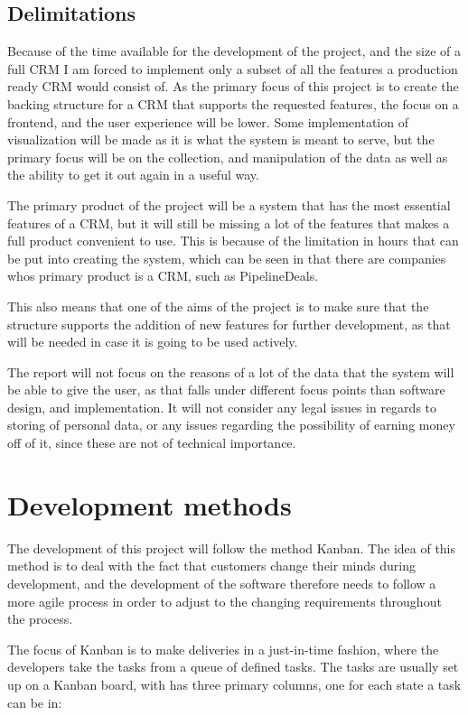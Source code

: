 \subsection{Delimitations}
\label{sub:Delimitations}
Because of the time available for the development of the project, and the size of a full CRM I am forced to implement only a subset of all the features a production ready CRM would consist of. As the primary focus of this project is to create the backing structure for a CRM that supports the requested features, the focus on a frontend, and the user experience will be lower. Some implementation of visualization will be made as it is what the system is meant to serve, but the primary focus will be on the collection, and manipulation of the data as well as the ability to get it out again in a useful way.

The primary product of the project will be a system that has the most essential features of a CRM, but it will still be missing a lot of the features that makes a full product convenient to use. This is because of the limitation in hours that can be put into creating the system, which can be seen in that there are companies whos primary product is a CRM, such as PipelineDeals.

This also means that one of the aims of the project is to make sure that the structure supports the addition of new features for further development, as that will be needed in case it is going to be used actively.

The report will not focus on the reasons of a lot of the data that the system will be able to give the user, as that falls under different focus points than software design, and implementation. It will not consider any legal issues in regards to storing of personal data, or any issues regarding the possibility of earning money off of it, since these are not of technical importance.

\section{Development methods}
\label{sec:Development methods}
The development of this project will follow the method Kanban. The idea of this method is to deal with the fact that customers change their minds during development, and the development of the software therefore needs to follow a more agile process in order to adjust to the changing requirements throughout the process.

The focus of Kanban is to make deliveries in a just-in-time fashion, where the developers take the tasks from a queue of defined tasks. The tasks are usually set up on a Kanban board, with has three primary columns, one for each state a task can be in:

